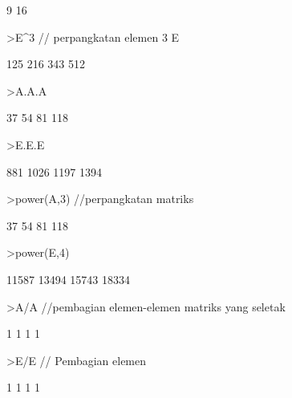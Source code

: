 \documentclass[a4paper,10pt]{article}
\begin{document}
\begin{eulernotebook}
\begin{eulercomment}
\begin{eulercomment}
\begin{eulercomment}
\begin{eulercomment}
\begin{euleroutput}
                        9                      16 
\end{euleroutput}
\begin{eulerprompt}
>E^3 // perpangkatan elemen 3 E
\end{eulerprompt}
\begin{euleroutput}
                      125                     216 
                      343                     512 
\end{euleroutput}
\begin{eulerprompt}
>A.A.A
\end{eulerprompt}
\begin{euleroutput}
                       37                      54 
                       81                     118 
\end{euleroutput}
\begin{eulerprompt}
>E.E.E
\end{eulerprompt}
\begin{euleroutput}
                      881                    1026 
                     1197                    1394 
\end{euleroutput}
\begin{eulerprompt}
>power(A,3) //perpangkatan matriks
\end{eulerprompt}
\begin{euleroutput}
                       37                      54 
                       81                     118 
\end{euleroutput}
\begin{eulerprompt}
>power(E,4)
\end{eulerprompt}
\begin{euleroutput}
                    11587                   13494 
                    15743                   18334 
\end{euleroutput}
\begin{eulerprompt}
>A/A //pembagian elemen-elemen matriks yang seletak
\end{eulerprompt}
\begin{euleroutput}
                        1                       1 
                        1                       1 
\end{euleroutput}
\begin{eulerprompt}
>E/E // Pembagian elemen
\end{eulerprompt}
\begin{euleroutput}
                        1                       1 
                        1                       1 
\end{euleroutput}

\end{eulercomment}
\end{eulercomment}
\end{eulercomment}
\end{eulercomment}
\end{eulernotebook}
\end{document}
